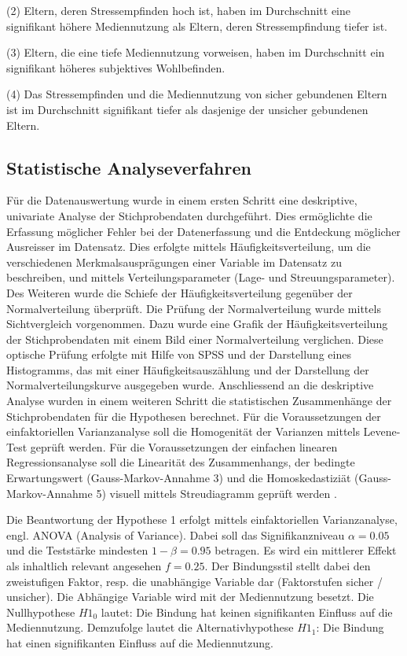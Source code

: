 (2) Eltern, deren Stressempfinden hoch ist, haben im Durchschnitt eine signifikant höhere Mediennutzung als Eltern, deren Stressempfindung tiefer ist.

(3) Eltern, die eine tiefe Mediennutzung vorweisen, haben im Durchschnitt ein signifikant höheres subjektives Wohlbefinden.

(4) Das Stressempfinden und die Mediennutzung von sicher gebundenen Eltern ist im Durchschnitt signifikant tiefer als dasjenige der unsicher gebundenen Eltern.


\subsection{Statistische Analyseverfahren}
Für die Datenauswertung wurde in einem ersten Schritt eine deskriptive, univariate Analyse der Stichprobendaten durchgeführt. Dies ermöglichte die Erfassung möglicher Fehler bei der Datenerfassung und die Entdeckung möglicher Ausreisser im Datensatz. Dies erfolgte mittels Häufigkeitsverteilung, um die verschiedenen Merkmalsausprägungen einer Variable im Datensatz zu beschreiben, und mittels Verteilungsparameter (Lage- und Streuungsparameter). Des Weiteren wurde die Schiefe der Häufigkeitsverteilung gegenüber der Normalverteilung überprüft. Die Prüfung der Normalverteilung wurde mittels Sichtvergleich vorgenommen. Dazu wurde eine Grafik der Häufigkeitsverteilung der Stichprobendaten mit einem Bild einer Normalverteilung verglichen. Diese optische Prüfung erfolgte mit Hilfe von SPSS und der Darstellung eines Histogramms, das mit einer Häufigkeitsauszählung und der Darstellung der Normalverteilungskurve ausgegeben wurde. Anschliessend an die deskriptive Analyse wurden in einem weiteren Schritt die statistischen Zusammenhänge der Stichprobendaten für die Hypothesen berechnet. Für die Voraussetzungen der einfaktoriellen Varianzanalyse soll die Homogenität der Varianzen mittels Levene-Test geprüft werden. Für die Voraussetzungen der einfachen linearen Regressionsanalyse soll die Linearität des Zusammenhangs, der bedingte Erwartungswert (Gauss-Markov-Annahme 3) und die Homoskedastiziät (Gauss-Markov-Annahme 5) visuell mittels Streudiagramm geprüft werden \cite{UniversitatZurich2018}.

Die Beantwortung der Hypothese 1 erfolgt mittels einfaktoriellen Varianzanalyse, engl. ANOVA (Analysis of Variance). Dabei soll das Signifikanzniveau $\alpha=0.05$ und die Teststärke mindesten $1-\beta=0.95$ betragen. Es wird ein mittlerer Effekt \cite{Cohen1988a} als inhaltlich relevant angesehen $f = 0.25$. Der Bindungsstil stellt dabei den zweistufigen Faktor, resp. die unabhängige Variable dar (Faktorstufen sicher / unsicher). Die Abhängige Variable wird mit der Mediennutzung besetzt. Die Nullhypothese $H1_{0}$ lautet: Die Bindung hat keinen signifikanten Einfluss auf die Mediennutzung. Demzufolge lautet die Alternativhypothese $H1_{1}$: Die Bindung hat einen signifikanten Einfluss auf die Mediennutzung.

